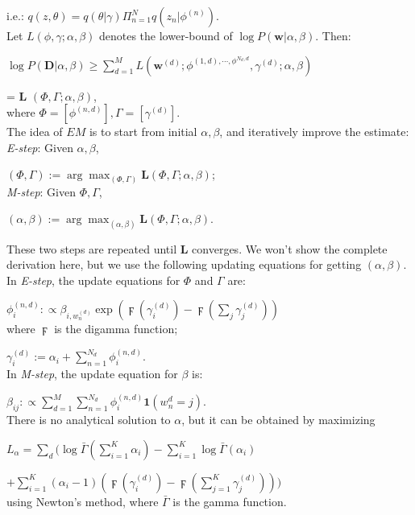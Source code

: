 \documentclass[conference,compsoc]{IEEEtran}
\begin{document}
  i.e.: $q(z, \theta) = q(\theta | \gamma) \Pi_{n=1}^N q(z_n | \phi^{(n)})$. \\
  Let $L(\phi, \gamma; \alpha, \beta)$ denotes the lower-bound of $\log P(\textbf{w} | \alpha, \beta)$. Then: 

  $\log P(\textbf{D} | \alpha, \beta) \geq \sum_{d=1}^M L(\textbf{w}^{(d)}; \phi^{(1,d), \cdots, \phi^{N_d, d}}, \gamma^{(d)}; \alpha, \beta) $


  = \textbf{L} $(\Phi, \Gamma; \alpha, \beta)$, \\
  where $\Phi = [\phi^{(n,d)}], \Gamma = [\gamma^{(d)}]$. \\

  The idea of $EM$ is to start from initial $\alpha, \beta$, and iteratively improve the estimate: \\
  \emph{E-step}: Given $\alpha, \beta$,

   $(\Phi, \Gamma) := \arg \max_{(\Phi, \Gamma)} \textbf{L}(\Phi, \Gamma; \alpha, \beta)$; \\
   \emph{M-step}: Given $\Phi, \Gamma$, 

   $(\alpha, \beta) := \arg \max_{(\alpha, \beta)} \textbf{L}(\Phi, \Gamma; \alpha, \beta)$.

   These two steps are repeated until \textbf{L} converges. We won't show the complete derivation here, but we use the following updating equations for getting $(\alpha, \beta)$. \\
  In \emph{E-step}, the update equations for $\Phi$ and $\Gamma$ are: 

  $\phi_i^{(n,d)} :\propto \beta_{i, w_n^{(d)}} \exp (\digamma (\gamma_i^{(d)}) - \digamma(\sum_j \gamma_j^{(d)}))$ \\
  where $\digamma$ is the digamma function; 

  $\gamma_i^{(d)} := \alpha_i + \sum_{n=1}^{N_d} \phi_i^{(n,d)}$. \\
  In \emph{M-step}, the update equation for $\beta$ is: 

  $\beta_{ij} :\propto \sum_{d=1}^M \sum_{n=1}^{N_d} \phi_i^{(n,d)} \textbf{1}(w_n^{d} = j)$. \\
  There is no analytical solution to $\alpha$, but it can be obtained by maximizing

  $L_\alpha = \sum_d (\log \bar{\Gamma} (\sum_{i=1}^K \alpha_i)  - \sum_{i=1}^K \log \bar{\Gamma} (\alpha_i) $

  $ + \sum_{i=1}^K (\alpha_i -1)(\digamma(\gamma_i^{(d)}) - \digamma(\sum_{j=1}^K \gamma_j^{(d)})))$ \\
  using Newton's method, where $\bar{\Gamma}$ is the gamma function. 
\end{document}
